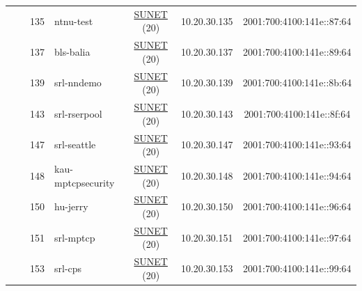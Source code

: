 \begin{small}
\begin{center}
\begin{longtable}{|c|c|c|c|c|c|c|c|}
  &  & \tiny{135} & \multicolumn{1}{|l|}{\tiny{ntnu-test}} & \multicolumn{2}{|c|}{\tiny{\href{http://www.sunet.se}{SUNET} (20)}} & \tiny{10.20.30.135} & \tiny{2001:700:4100:141e::87:64} \\* \cline{3-3}\cline{4-4}\cline{5-5}\cline{6-6}\cline{7-7}\cline{8-8}
  &  & \tiny{137} & \multicolumn{1}{|l|}{\tiny{bls-balia}} & \multicolumn{2}{|c|}{\tiny{\href{http://www.sunet.se}{SUNET} (20)}} & \tiny{10.20.30.137} & \tiny{2001:700:4100:141e::89:64} \\* \cline{3-3}\cline{4-4}\cline{5-5}\cline{6-6}\cline{7-7}\cline{8-8}
  &  & \tiny{139} & \multicolumn{1}{|l|}{\tiny{srl-nndemo}} & \multicolumn{2}{|c|}{\tiny{\href{http://www.sunet.se}{SUNET} (20)}} & \tiny{10.20.30.139} & \tiny{2001:700:4100:141e::8b:64} \\* \cline{3-3}\cline{4-4}\cline{5-5}\cline{6-6}\cline{7-7}\cline{8-8}
  &  & \tiny{143} & \multicolumn{1}{|l|}{\tiny{srl-rserpool}} & \multicolumn{2}{|c|}{\tiny{\href{http://www.sunet.se}{SUNET} (20)}} & \tiny{10.20.30.143} & \tiny{2001:700:4100:141e::8f:64} \\* \cline{3-3}\cline{4-4}\cline{5-5}\cline{6-6}\cline{7-7}\cline{8-8}
  &  & \tiny{147} & \multicolumn{1}{|l|}{\tiny{srl-seattle}} & \multicolumn{2}{|c|}{\tiny{\href{http://www.sunet.se}{SUNET} (20)}} & \tiny{10.20.30.147} & \tiny{2001:700:4100:141e::93:64} \\* \cline{3-3}\cline{4-4}\cline{5-5}\cline{6-6}\cline{7-7}\cline{8-8}
  &  & \tiny{148} & \multicolumn{1}{|l|}{\tiny{kau-mptcpsecurity}} & \multicolumn{2}{|c|}{\tiny{\href{http://www.sunet.se}{SUNET} (20)}} & \tiny{10.20.30.148} & \tiny{2001:700:4100:141e::94:64} \\* \cline{3-3}\cline{4-4}\cline{5-5}\cline{6-6}\cline{7-7}\cline{8-8}
  &  & \tiny{150} & \multicolumn{1}{|l|}{\tiny{hu-jerry}} & \multicolumn{2}{|c|}{\tiny{\href{http://www.sunet.se}{SUNET} (20)}} & \tiny{10.20.30.150} & \tiny{2001:700:4100:141e::96:64} \\* \cline{3-3}\cline{4-4}\cline{5-5}\cline{6-6}\cline{7-7}\cline{8-8}
  &  & \tiny{151} & \multicolumn{1}{|l|}{\tiny{srl-mptcp}} & \multicolumn{2}{|c|}{\tiny{\href{http://www.sunet.se}{SUNET} (20)}} & \tiny{10.20.30.151} & \tiny{2001:700:4100:141e::97:64} \\* \cline{3-3}\cline{4-4}\cline{5-5}\cline{6-6}\cline{7-7}\cline{8-8}
  &  & \tiny{153} & \multicolumn{1}{|l|}{\tiny{srl-cps}} & \multicolumn{2}{|c|}{\tiny{\href{http://www.sunet.se}{SUNET} (20)}} & \tiny{10.20.30.153} & \tiny{2001:700:4100:141e::99:64} \\* \cline{3-3}\cline{4-4}\cline{5-5}\cline{6-6}\cline{7-7}\cline{8-8}

\end{longtable}
\end{center}
\end{small}
